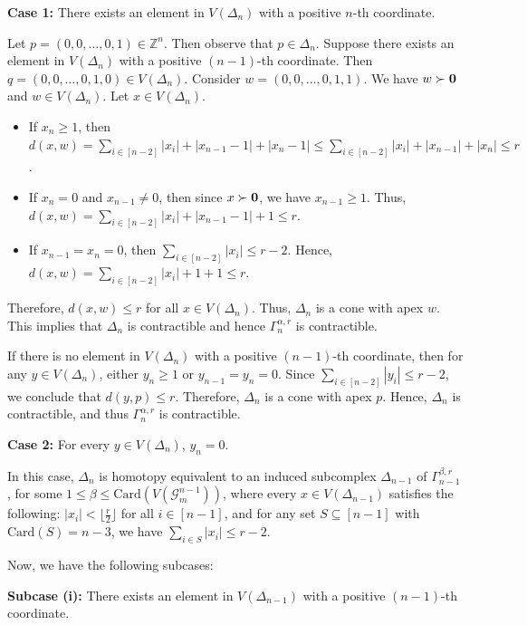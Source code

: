 \documentclass{amsart}
\theoremstyle{definition}
\theoremstyle{remark}
\numberwithin{equation}{section}
\newcommand{\D}{\Delta}
\newcommand{\f}{\lfloor\frac{r}{2}\rfloor}
\def\Z{{\mathbb{Z}}}
\begin{document}
    \smallskip
	\noindent \textbf{Case 1:} There exists an element in $V(\Delta_n)$ with a positive $n$-th coordinate.

Let $p=(0,0,\ldots,0,1) \in \Z^n$. Then observe that $p \in \Delta_n$.  Suppose there exists an element in $V(\Delta_n)$ with a positive $(n-1)$-th coordinate. Then $q = (0,0,\ldots,0,1,0) \in V(\Delta_n)$. Consider $w = (0,0,\ldots,0,1,1)$. We have $w \succ {\bf{0}}$ and $w \in V(\Delta_n)$. Let $x \in V(\Delta_n)$. 
\begin{itemize}
	\item If $x_n \geq 1$, then $d(x,w) = \sum_{i \in [n-2]} |x_i| + |x_{n-1}-1| + |x_n-1| \leq \sum_{i \in [n-2]} |x_i| + |x_{n-1}| + |x_n| \leq r$.
	\item If $x_n = 0$ and $x_{n-1} \neq 0$, then since $x \succ {\bf{0}}$, we have $x_{n-1} \geq 1$. Thus, $d(x,w) = \sum_{i \in [n-2]} |x_i| + |x_{n-1}-1| + 1 \leq r$.
	\item If $x_{n-1} = x_n = 0$, then $\sum_{i \in [n-2]} |x_i| \leq r-2$. Hence, $d(x,w) = \sum_{i \in [n-2]} |x_i| + 1 + 1 \leq r$.
\end{itemize}

Therefore, $d(x,w)\leq r$ for all $x\in V(\Delta_n)$. Thus, $\D_n$ is a cone with apex  $w$. This implies that $\D_n$ is contractible and hence 
$\Gamma_n^{\alpha, r}$ is contractible.


If there is no element in $V(\Delta_n)$ with a positive $(n-1)$-th coordinate, then for any $y \in V(\Delta_n)$, either $y_n\geq 1$ or $y_{n-1} = y_n = 0$. Since $\sum_{i\in [n-2]} |y_i| \leq r-2$,   we conclude that $d(y,p) \leq r$. Therefore, $\Delta_n$ is a cone with apex  $p$. Hence, $\Delta_n$ is contractible, and thus $\Gamma_n^{\alpha, r}$ is contractible.

\smallskip
\noindent
\textbf{Case 2:} For every $y \in V(\Delta_n)$, $y_n = 0$.

In this case, $\Delta_n$ is homotopy equivalent to an induced subcomplex $\Delta_{n-1}$ of $\Gamma_{n-1}^{\beta,r}$, for some $1 \leq \beta \leq \text{Card}(V(\mathcal{G}_m^{n-1}))$, where every $x \in V(\Delta_{n-1})$ satisfies the following: $|x_i| < \f$ for all $i \in [n-1]$, and for any set $S \subseteq [n-1]$ with $\text{Card}(S) = n-3$, we have $\sum_{i \in S} |x_i| \leq r-2$.

Now, we have the following subcases:



    \smallskip
	\noindent \textbf{Subcase (i):} There exists an element in $V(\Delta_{n-1})$ with a positive $(n-1)$-th coordinate.
\end{document}
